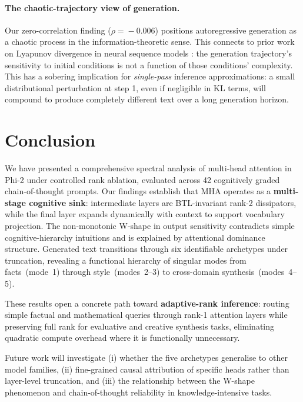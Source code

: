 \documentclass{article}
\begin{document}
\paragraph{The chaotic-trajectory view of generation.}
Our zero-correlation finding ($\rho\!=\!-0.006$) positions autoregressive generation
as a chaotic process in the information-theoretic sense.
This connects to prior work on Lyapunov divergence in neural sequence models
\citep{engelmann2023lyapunov}: the generation trajectory's sensitivity to initial
conditions is not a function of those conditions' complexity.
This has a sobering implication for \emph{single-pass} inference approximations:
a small distributional perturbation at step 1, even if negligible in KL terms,
will compound to produce completely different text over a long generation horizon.

\section{Conclusion}
\label{sec:conclusion}

We have presented a comprehensive spectral analysis of multi-head attention in
Phi-2 under controlled rank ablation, evaluated across 42 cognitively graded
chain-of-thought prompts.
Our findings establish that MHA operates as a \textbf{multi-stage cognitive sink}:
intermediate layers are BTL-invariant rank-2 dissipators, while the final layer
expands dynamically with context to support vocabulary projection.
The non-monotonic W-shape in output sensitivity contradicts simple cognitive-hierarchy
intuitions and is explained by attentional dominance structure.
Generated text transitions through six identifiable archetypes under truncation,
revealing a functional hierarchy of singular modes from facts~(mode~1) through
style~(modes~2--3) to cross-domain synthesis~(modes~4--5).

These results open a concrete path toward \textbf{adaptive-rank inference}: routing
simple factual and mathematical queries through rank-1 attention layers while
preserving full rank for evaluative and creative synthesis tasks, eliminating
quadratic compute overhead where it is functionally unnecessary.

Future work will investigate (i) whether the five archetypes generalise to other
model families, (ii) fine-grained causal attribution of specific heads rather than
layer-level truncation, and (iii) the relationship between the W-shape phenomenon
and chain-of-thought reliability in knowledge-intensive tasks.
\end{document}
